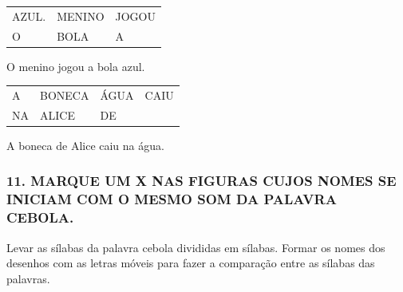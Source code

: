 \begin{longtable}[]{@{}lll@{}}
\toprule
AZUL. & MENINO & JOGOU\tabularnewline
O & BOLA & A\tabularnewline
\bottomrule
\end{longtable}

O menino jogou a bola azul.

\begin{longtable}[]{@{}llll@{}}
\toprule
A & BONECA & ÁGUA & CAIU\tabularnewline
NA & ALICE & DE\tabularnewline
\bottomrule
\end{longtable}

A boneca de Alice caiu na água.

\subsubsection{11. MARQUE UM X NAS FIGURAS CUJOS NOMES SE INICIAM COM O MESMO SOM DA PALAVRA CEBOLA.}\label{marque-um-x-nas-figuras-cujo-o-nome-comeuxe7a-igual-a-palavra-cebola.}

Levar as sílabas da palavra cebola divididas em sílabas. Formar os
nomes dos desenhos com as letras móveis para fazer a comparação entre as
sílabas das palavras.

